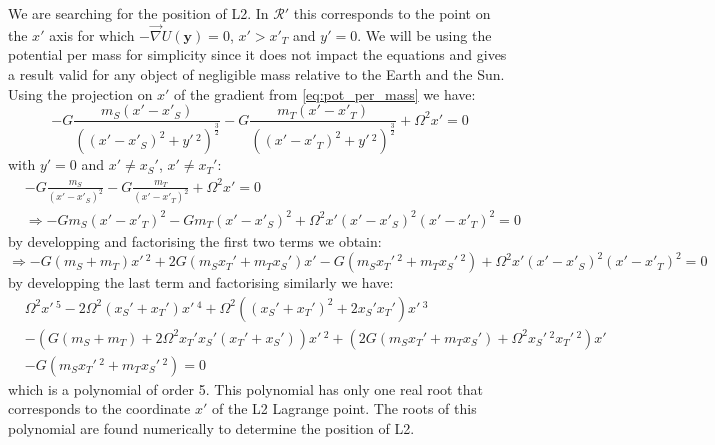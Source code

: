 We are searching for the position of L2. In $\mathcal{R}'$ this corresponds to the point on the $x'$ axis for which $-\vec{\nabla}U(\mathbf{y}) = 0$, $x' > x'_T$ and $y' = 0$. We will be using the potential per mass for simplicity since it does not impact the equations and gives a result valid for any object of negligible mass relative to the Earth and the Sun. Using the projection on $x'$ of the gradient from \autoref{eq:pot_per_mass} we have:
\begin{equation}
    - G \frac{m_S(x' - x'_S)}{\left((x' - x'_S)^2 + y'\,^2\right)^\frac{3}{2}} - G \frac{m_T(x' - x'_T)}{\left((x' - x'_T)^2 + y'\,^2\right)^\frac{3}{2}} + \Omega^2 x' = 0
\end{equation}
with $y' = 0$ and $x' \neq x_S'$, $x' \neq x_T'$:
\[
    \begin{aligned}
        &-G\frac{m_S}{(x'-x'_S)^2} -G\frac{m_T}{(x'-x'_T)^2} + \Omega^2 x' = 0 \\
        & \Rightarrow -Gm_S(x'-x'_T)^2 - Gm_T(x'-x'_S)^2 + \Omega^2 x'(x'-x'_S)^2(x'-x'_T)^2 = 0
    \end{aligned}
\]
by developping and factorising the first two terms we obtain:
\[
    \Rightarrow -G(m_S+m_T)x'\,^2 + 2G(m_Sx_T' + m_Tx_S')x' - G(m_Sx_T'\,^2 + m_Tx_S'\,^2) + \Omega^2 x'(x'-x'_S)^2(x'-x'_T)^2 = 0
\]
by developping the last term and factorising similarly we have:
\begin{equation}
    \begin{aligned}
            &\Omega^2 x'\,^5 - 2\Omega^2(x_S' + x_T')x'\,^4 + \Omega^2\left((x_S' + x_T')^2 + 2x_S'x_T'\right)x'\,^3 \\
            &- \left(G(m_S+m_T) + 2\Omega^2 x_T'x_S'(x_T' + x_S')\right)x'\,^2 + \left(2G(m_Sx_T' + m_Tx_S') + \Omega^2x_S'\,^2x_T'\,^2\right)x'  \\
            &- G\left(m_Sx_T'\,^2 + m_Tx_S'\,^2\right) = 0
    \end{aligned}
\end{equation}
which is a polynomial of order 5. This polynomial has only one real root that corresponds to the coordinate $x'$ of the L2 Lagrange point. The roots of this polynomial are found numerically to determine the position of L2.